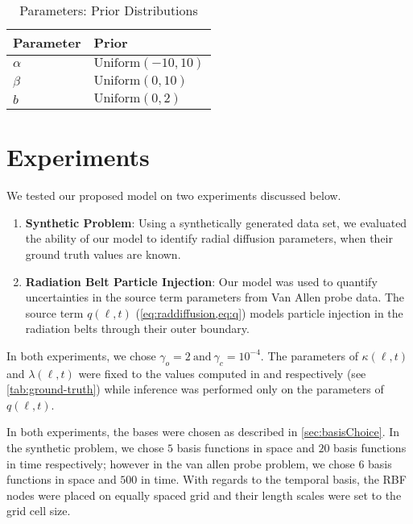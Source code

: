 \begin{table}[ht]
  \caption{Parameters: Prior Distributions}
  \label{tab:prior}
  \centering
  \begin{tabular}{ll}
    \hline
    \textbf{Parameter} & \textbf{Prior}\\
    \hline
    $\alpha$ & $\text{Uniform}(-10, 10)$ \\
    $\beta$  & $\text{Uniform}(0, 10)$ \\ 
    $b$ & $\text{Uniform}(0, 2)$ \\
    \hline
  \end{tabular}
\end{table}


\section{Experiments}\label{sec:exp}

We tested our proposed model on two experiments discussed below.
%
\begin{enumerate}
  \item \textbf{Synthetic Problem}: Using a synthetically generated data set, we evaluated the 
        ability of our model to identify radial diffusion parameters, when their ground truth 
        values are known.
  \item \textbf{Radiation Belt Particle Injection}: Our model was used to quantify uncertainties in 
        the source term parameters from Van Allen probe data. The source term $q(\ell, t)$ 
        (\cref{eq:raddiffusion,eq:q}) models particle injection in the radiation belts through 
        their outer boundary. 
\end{enumerate}

In both experiments, we chose $\gamma_o = 2 \ \text{and} \ \gamma_c = 10^{-4}$. The parameters of 
$\kappa(\ell, t)$ and $\lambda(\ell, t)$ were fixed to the values computed in 
\citet{JGRA:JGRA15067} and \citet{GRL:GRL22815} respectively (see \cref{tab:ground-truth}) while 
inference was performed only on the parameters of $q(\ell, t)$. 

In both experiments, the bases were chosen as described in \cref{sec:basisChoice}. In the 
synthetic problem, we chose $5$ basis functions in space and $20$ basis functions in time 
respectively; however in the van allen probe problem, we chose $6$ basis functions in space and 
$500$ in time. With regards to the temporal basis, the RBF nodes were placed on equally spaced grid 
and their length scales were set to the grid cell size. 

